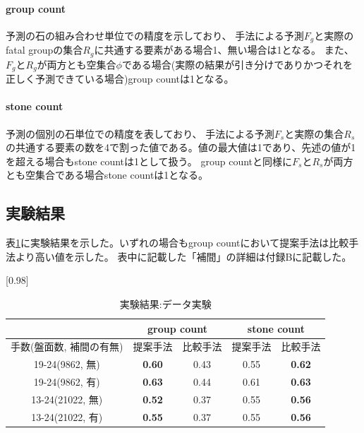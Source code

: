 \paragraph{group count}
予測の石の組み合わせ単位での精度を示しており、
手法による予測$F_g$と実際のfatal groupの集合$R_g$に共通する要素がある場合1、無い場合は1となる。
また、$F_g$と$R_g$が両方とも空集合$\phi$である場合(実際の結果が引き分けでありかつそれを正しく予測できている場合)group countは1となる。
\paragraph{stone count}
予測の個別の石単位での精度を表しており、
手法による予測$F_s$と実際の集合$R_s$の共通する要素の数を4で割った値である。値の最大値は1であり、先述の値が1を超える場合もstone countは1として扱う。
group countと同様に$F_s$と$R_s$が両方とも空集合である場合stone countは1となる。
\subsection{実験結果}


表\ref{table:result-online}に実験結果を示した。いずれの場合もgroup countにおいて提案手法は比較手法より高い値を示した。
表中に記載した「補間」の詳細は付録Bに記載した。
\begin{table}[H]
	\caption{実験結果:データ実験}
	\centering
	\scalebox{0.98}[0.98]{
		\begin{tabular}{c|c|c|c|c}
			\multicolumn{1}{c}{} & \multicolumn{2}{|c|}{group count} 
			& \multicolumn{2}{c|}{stone count}\\ \hline \hline
			手数(盤面数, 補間の有無)    & 提案手法 & 比較手法 & 提案手法 & 比較手法 \\ \hline
			19-24(9862, 無)    & \bf{0.60} & 0.43 & 0.55 & \bf{0.62} \\
			19-24(9862, 有)    & \bf{0.63} & 0.44 & 0.61 & \bf{0.63}  \\
			13-24(21022, 無)   & \bf{0.52} & 0.37 & 0.55 & \bf{0.56}  \\
			13-24(21022, 有)   & \bf{0.55} & 0.37 & 0.55 & \bf{0.56}  \\
		\end{tabular}
	}
	\label{table:result-online}
\end{table}
